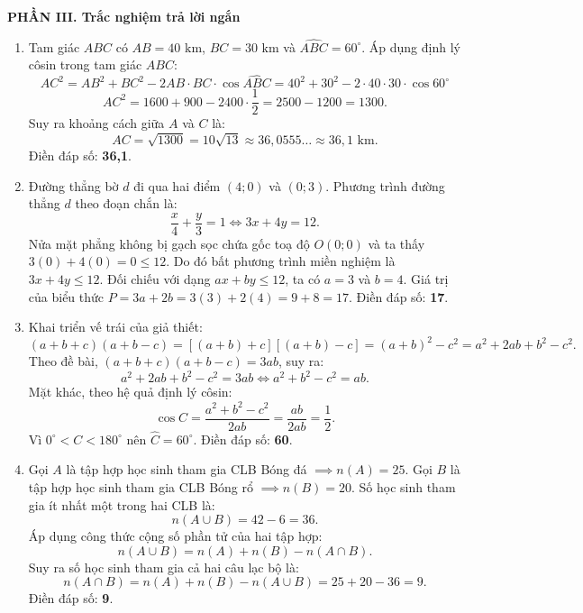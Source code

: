 \documentclass[12pt,a4paper]{article}
\begin{document}
\vspace{0.1cm}
\textbf{\large PHẦN III. Trắc nghiệm trả lời ngắn}
\begin{enumerate}
\item Tam giác $ABC$ có $AB = 40\text{ km}$, $BC = 30\text{ km}$ và $\widehat{ABC} = 60^\circ$.
Áp dụng định lý côsin trong tam giác $ABC$:
\[
AC^2 = AB^2 + BC^2 - 2AB \cdot BC \cdot \cos \widehat{ABC} = 40^2 + 30^2 - 2 \cdot 40 \cdot 30 \cdot \cos 60^\circ
\]
\[
AC^2 = 1600 + 900 - 2400 \cdot \dfrac{1}{2} = 2500 - 1200 = 1300.
\]
Suy ra khoảng cách giữa $A$ và $C$ là:
\[
AC = \sqrt{1300} = 10\sqrt{13} \approx 36{,}0555\dots \approx 36{,}1\text{ km}.
\]
Điền đáp số: \textbf{36,1}.

\item Đường thẳng bờ $d$ đi qua hai điểm $(4; 0)$ và $(0; 3)$. Phương trình đường thẳng $d$ theo đoạn chắn là:
\[
\dfrac{x}{4} + \dfrac{y}{3} = 1 \iff 3x + 4y = 12.
\]
Nửa mặt phẳng không bị gạch sọc chứa gốc toạ độ $O(0; 0)$ và ta thấy $3(0) + 4(0) = 0 \le 12$. Do đó bất phương trình miền nghiệm là $3x + 4y \le 12$.
Đối chiếu với dạng $ax + by \le 12$, ta có $a = 3$ và $b = 4$.
Giá trị của biểu thức $P = 3a + 2b = 3(3) + 2(4) = 9 + 8 = 17$.
Điền đáp số: \textbf{17}.

\item Khai triển vế trái của giả thiết:
\[
(a + b + c)(a + b - c) = [(a + b) + c][(a + b) - c] = (a + b)^2 - c^2 = a^2 + 2ab + b^2 - c^2.
\]
Theo đề bài, $(a + b + c)(a + b - c) = 3ab$, suy ra:
\[
a^2 + 2ab + b^2 - c^2 = 3ab \iff a^2 + b^2 - c^2 = ab.
\]
Mặt khác, theo hệ quả định lý côsin:
\[
\cos C = \dfrac{a^2 + b^2 - c^2}{2ab} = \dfrac{ab}{2ab} = \dfrac{1}{2}.
\]
Vì $0^\circ < C < 180^\circ$ nên $\widehat{C} = 60^\circ$.
Điền đáp số: \textbf{60}.

\item Gọi $A$ là tập hợp học sinh tham gia CLB Bóng đá $\implies n(A) = 25$.
Gọi $B$ là tập hợp học sinh tham gia CLB Bóng rổ $\implies n(B) = 20$.
Số học sinh tham gia ít nhất một trong hai CLB là:
\[
n(A \cup B) = 42 - 6 = 36.
\]
Áp dụng công thức cộng số phần tử của hai tập hợp:
\[
n(A \cup B) = n(A) + n(B) - n(A \cap B).
\]
Suy ra số học sinh tham gia cả hai câu lạc bộ là:
\[
n(A \cap B) = n(A) + n(B) - n(A \cup B) = 25 + 20 - 36 = 9.
\]
Điền đáp số: \textbf{9}.
\end{enumerate}
\end{document}
